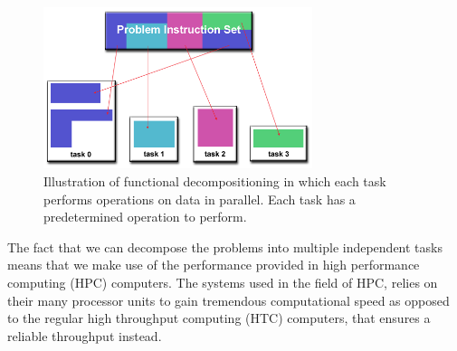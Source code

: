 \begin{figure}[htbp]
\centering
\includegraphics[width=0.7\textwidth]{Analysis/Supercomputing/functional_decomp.png}
\caption{Illustration of functional decompositioning in which each task performs operations on data in parallel. Each task has a predetermined operation to perform. \cite{compLLNL}}\label{fig:fun}
\end{figure}

The fact that we can decompose the problems into multiple independent tasks means that we make use of the performance provided in high performance computing (HPC) computers. The systems used in the field of HPC, relies on their many processor units to gain tremendous computational speed as opposed to the regular high throughput computing (HTC) computers, that ensures a reliable throughput instead.
